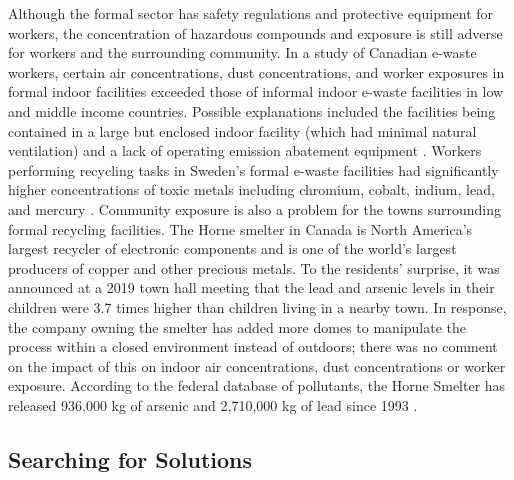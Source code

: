 \documentclass{article}
\begin{document}
Although the formal sector has safety regulations and protective equipment for workers, the concentration of hazardous compounds and exposure is still adverse for workers and the surrounding community. In a study of Canadian e-waste workers, certain air concentrations, dust concentrations, and worker exposures in formal indoor facilities exceeded those of informal indoor e-waste facilities in low and middle income countries. Possible explanations included the facilities being contained in a large but enclosed indoor facility (which had minimal natural ventilation) and a lack of operating emission abatement equipment \cite{nguyen2019exposure, nguyen2020can}. Workers performing recycling tasks in Sweden's formal e-waste facilities had significantly higher concentrations of toxic metals including chromium, cobalt, indium, lead, and mercury \cite{julander2014formal}. Community exposure is also a problem for the towns surrounding formal recycling facilities. The Horne smelter in Canada is North America's largest recycler of electronic components and is one of the world's largest producers of copper and other precious metals. To the residents' surprise, it was announced at a 2019 town hall meeting that the lead and arsenic levels in their children were 3.7 times higher than children living in a nearby town. In response, the company owning the smelter has added more domes to manipulate the process within a closed environment instead of outdoors; there was no comment on the impact of this on indoor air concentrations, dust concentrations or worker exposure. According to the federal database of pollutants, the Horne Smelter has released 936,000 kg of arsenic and 2,710,000 kg of lead since 1993 \cite{cbc2019hornesmelter}.


\subsection{Searching for Solutions}
\end{document}
